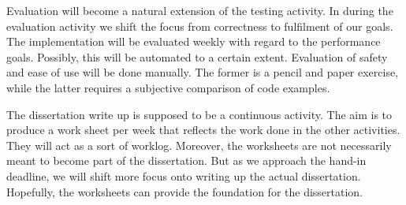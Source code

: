 \documentclass[preprint,10pt,numbers]{sigplanconf}
\begin{document}
Evaluation will become a natural extension of the testing activity. In during the evaluation activity we shift the focus from correctness to fulfilment of our goals. The implementation will be evaluated weekly with regard to the performance goals. Possibly, this will be automated to a certain extent. Evaluation of safety and ease of use will be done manually. The former is a pencil and paper exercise, while the latter requires a subjective comparison of code examples.

The dissertation write up is supposed to be a continuous activity. The aim is to produce a work sheet per week that reflects the work done in the other activities. They will act as a sort of worklog. Moreover, the worksheets are not necessarily meant to become part of the dissertation. But as we approach the hand-in deadline, we will shift more focus onto writing up the actual dissertation. Hopefully, the worksheets can provide the foundation for the dissertation.



\softraggedright

\end{document}
